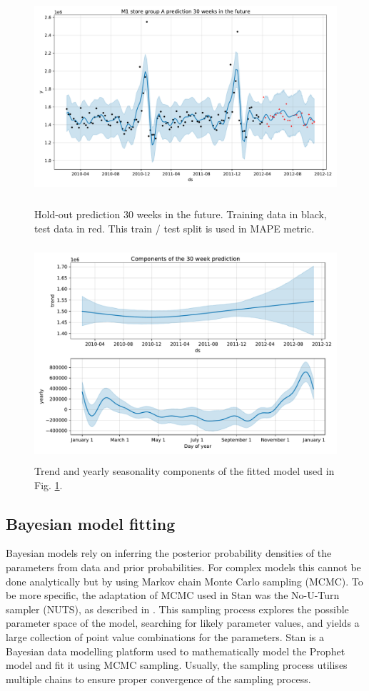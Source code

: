 \documentclass[english, 12pt, a4paper, sci, utf8, a-1b, online]{aaltothesis}
\begin{document}
\begin{figure}[htb]
	\centering
	\includegraphics[height=8cm]{../plots/forecasts/30_weeks_prediction_demo.pdf}
	\caption{Hold-out prediction 30 weeks in the future. Training data in black, test data in red. This train / test split is used in MAPE metric.}
	\label{fig:hold_out_data}
\end{figure}

\begin{figure}[htb]
	\centering
	\includegraphics[height=8cm]{../plots/forecasts/30_weeks_prediction_components_demo.pdf}
	\caption{Trend and yearly seasonality components of the fitted model used in Fig. \ref{fig:hold_out_data}.}
	\label{fig:prediction_components_demo}
\end{figure}

\subsection{Bayesian model fitting}

Bayesian models rely on inferring the posterior probability densities of the parameters from data and prior probabilities. For complex models this cannot be done analytically but by using Markov chain Monte Carlo sampling (MCMC). To be more specific, the adaptation of MCMC used in Stan was the No-U-Turn sampler (NUTS), as described in \cite{NUTS}. This sampling process explores the possible parameter space of the model, searching for likely parameter values, and yields a large collection of point value combinations for the parameters. Stan is a Bayesian data modelling platform used to mathematically model the Prophet model and fit it using MCMC sampling. Usually, the sampling process utilises multiple chains to ensure proper convergence of the sampling process.
\end{document}
